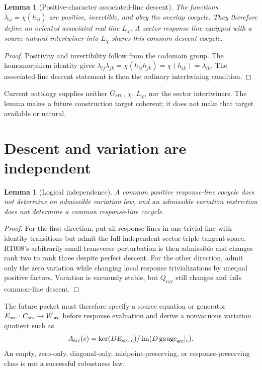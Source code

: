 \documentclass[11pt]{article}
\newtheorem{lemma}[theorem]{Lemma}
\newcommand{\Qray}{Q_{\mathrm{ray}}}
\begin{document}
\begin{lemma}[Positive-character associated-line descent]
The functions $\lambda_{ij}=\chi(h_{ij})$ are positive, invertible, and obey
the overlap cocycle.  They therefore define an oriented associated real line
$L_\chi$.  A sector response line equipped with a source-natural intertwiner
into $L_\chi$ shares this common descent cocycle.
\end{lemma}

\begin{proof}
Positivity and invertibility follow from the codomain group.  The homomorphism
identity gives
$\lambda_{ij}\lambda_{jk}=\chi(h_{ij}h_{jk})=\chi(h_{ik})=\lambda_{ik}$.
The associated-line descent statement is then the ordinary intertwining
condition.
\end{proof}

Current ontology supplies neither $G_{\rm src}$, $\chi$, $L_\chi$, nor the
sector intertwiners.  The lemma makes a future construction target coherent;
it does not make that target available or natural.

\section{Descent and variation are independent}

\begin{lemma}[Logical independence]
A common positive response-line cocycle does not determine an admissible
variation law, and an admissible variation restriction does not determine a
common response-line cocycle.
\end{lemma}

\begin{proof}
For the first direction, put all response lines in one trivial line with
identity transitions but admit the full independent sector-triple tangent
space.  RT008's arbitrarily small transverse perturbation is then admissible
and changes rank two to rank three despite perfect descent.  For the other
direction, admit only the zero variation while changing local response
trivializations by unequal positive factors.  Variation is vacuously stable,
but $\Qray$ still changes and fails common-line descent.
\end{proof}

The future packet must therefore specify a source equation or generator
$E_{\rm src}:C_{\rm src}\to W_{\rm src}$ before response evaluation and derive
a nonvacuous variation quotient such as
\[
 A_{\rm src}(c)=
 \ker(D E_{\rm src}|_c)/\operatorname{im}(D\,\mathrm{gauge}_{\rm src}|_c).
\]
An empty, zero-only, diagonal-only, midpoint-preserving, or response-preserving
class is not a successful robustness law.
\end{document}
